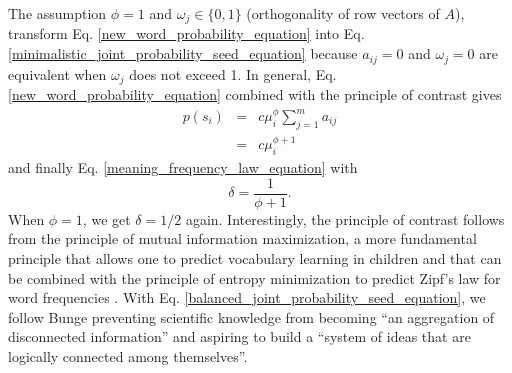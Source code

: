\documentclass{article}
\begin{document}
The assumption $\phi = 1$ and $\omega_j \in \{0,1\}$ (orthogonality of row vectors of $A$), transform Eq. \ref{new_word_probability_equation} into Eq. \ref{minimalistic_joint_probability_seed_equation} because $a_{ij} = 0$ and $\omega_j=0$ are equivalent when $\omega_j$ does not exceed 1. In general, Eq. \ref{new_word_probability_equation} combined with the principle of contrast gives 
\begin{eqnarray*}
p(s_i) & = & c \mu_i^\phi \sum_{j=1}^m a_{ij} \\
       & = & c \mu_i^{\phi+1} 
\end{eqnarray*}
and finally Eq. \ref{meaning_frequency_law_equation} with 
\begin{equation*}
\delta=\frac{1}{\phi + 1}.
\end{equation*}
When $\phi = 1$, we get $\delta=1/2$ again.
Interestingly, the principle of contrast follows from the principle of mutual information maximization, a more fundamental principle that allows one to predict vocabulary learning in children and that can be combined with the principle of entropy minimization to predict Zipf's law for word frequencies \cite{Ferrer2013g}.  
With Eq. \ref{balanced_joint_probability_seed_equation}, we follow Bunge \cite[pp. 32-33]{Bunge2013a} preventing scientific knowledge from becoming ``an aggregation of disconnected information'' and aspiring to build a ``system of ideas that are logically connected among themselves''. 
  
\end{document}

